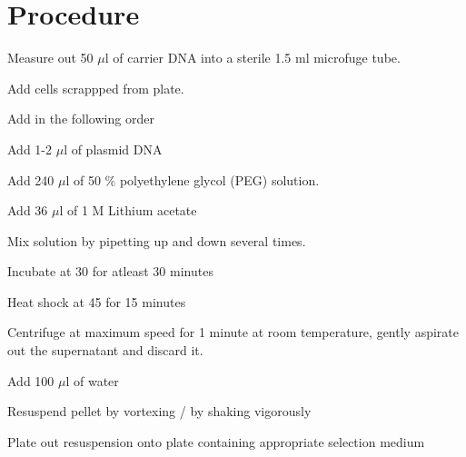 \section{Procedure}
	\begin{packed_enum}
		\item Measure out 50 $\mu$l of carrier DNA into a sterile 1.5 ml microfuge tube.
		\item Add cells scrappped from plate.
		\item Add in the following order
		\begin{packed_enum}
		\item Add 1-2 $\mu$l of plasmid DNA
		\item Add 240 $\mu$l of 50 \% polyethylene glycol (PEG) solution.
		\item Add 36 $\mu$l of 1 M Lithium acetate 
		\end{packed_enum}
		\item Mix solution by  pipetting up and down several times.
		\item Incubate at 30 {\textcelsius} for atleast 30 minutes
		\item Heat shock at 45 {\textcelsius} for 15 minutes
		\item Centrifuge at maximum speed for 1 minute at room temperature, gently aspirate out the supernatant and discard it.
		\item Add 100 $\mu$l of water
		\begin{packed_enum}
		\item Resuspend pellet by vortexing / by shaking vigorously
		\item Plate out resuspension onto plate containing appropriate selection medium
		\end{packed_enum}
	\end{packed_enum}

